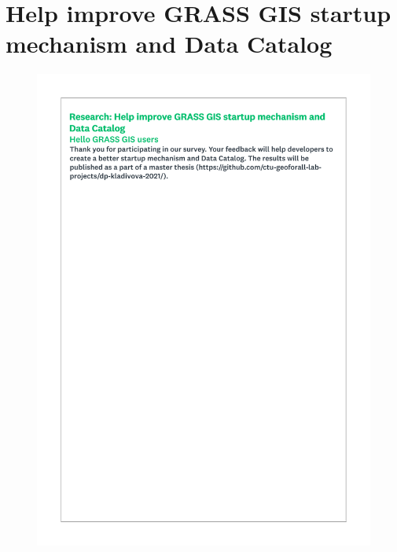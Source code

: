 \documentclass[a4paper,10pt,twoside]{article}
\begin{document}
\noindent
\large

\newpage
\vspace*{-1cm}
\appendix
\section{Help improve GRASS GIS startup mechanism and Data Catalog }
\label{appendix:A}
\setcounter{page}{1}  %
 
 \begin{figure}[hbt!]
 \begin{center}
 \includegraphics[width=12.5cm]{../surveys/questionnaires/survey1_part1_page1_intro.pdf}
 \end{center}
 \end{figure}
 
\end{document}
